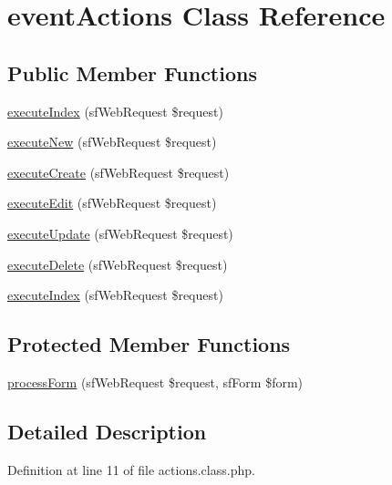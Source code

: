 \hypertarget{classevent_actions}{\section{event\-Actions Class Reference}
\label{classevent_actions}
}
\subsection*{Public Member Functions}
\begin{DoxyCompactItemize}
\item 
\hyperlink{classevent_actions_a948cc911eb1d9f77990be54af3b2080f}{execute\-Index} (sf\-Web\-Request \$request)
\item 
\hyperlink{classevent_actions_a0ffbea56560c6c633dae68ec22aff21c}{execute\-New} (sf\-Web\-Request \$request)
\item 
\hyperlink{classevent_actions_a75837617743fb64dca82d8133b2c662a}{execute\-Create} (sf\-Web\-Request \$request)
\item 
\hyperlink{classevent_actions_af4d8fedd4b28f3398826a1bb8fa54394}{execute\-Edit} (sf\-Web\-Request \$request)
\item 
\hyperlink{classevent_actions_af7b4f51862add3c2ebb54efc136a0840}{execute\-Update} (sf\-Web\-Request \$request)
\item 
\hyperlink{classevent_actions_a52b5b11b11a0070dd2662257520c045a}{execute\-Delete} (sf\-Web\-Request \$request)
\item 
\hyperlink{classevent_actions_a948cc911eb1d9f77990be54af3b2080f}{execute\-Index} (sf\-Web\-Request \$request)
\end{DoxyCompactItemize}
\subsection*{Protected Member Functions}
\begin{DoxyCompactItemize}
\item 
\hyperlink{classevent_actions_a7cf661d837626e0320753cbffa019a01}{process\-Form} (sf\-Web\-Request \$request, sf\-Form \$form)
\end{DoxyCompactItemize}


\subsection{Detailed Description}


Definition at line 11 of file actions.\-class.\-php.



